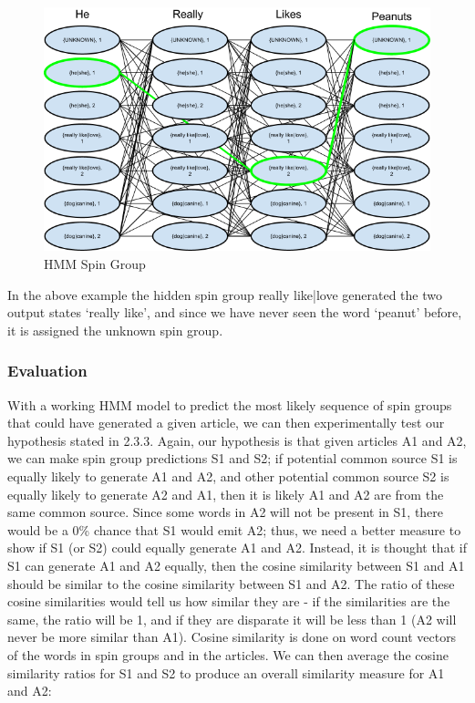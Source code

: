 \documentclass[11pt,letterpaper,oneside, titlepage]{scrartcl}
\begin{document}
\begin{figure}[h!]
  \centering
  \includegraphics[width=1\textwidth]{hmm_spin_group}
  \caption{HMM Spin Group}
  \label{fig:hmm_spin_group}
\end{figure}

\clearpage

In the above example the hidden spin group {really like|love} generated the two output states ‘really like’, and since we have never seen the word ‘peanut’ before, it is assigned the unknown spin group.

\subsubsection{Evaluation}

With a working HMM model to predict the most likely sequence of spin groups that could have generated a given article, we can then experimentally test our hypothesis stated in 2.3.3. Again, our hypothesis is that given articles A1 and A2, we can make spin group predictions S1 and S2; if potential common source S1 is equally likely to generate A1 and A2, and other potential common source S2 is equally likely to generate A2 and A1, then it is likely A1 and A2 are from the same common source. Since some words in A2 will not be present in S1, there would be a 0\% chance that S1 would emit A2; thus, we need a better measure to show if S1 (or S2) could equally generate A1 and A2. Instead, it is thought that if S1 can generate A1 and A2 equally, then the cosine similarity between S1 and A1 should be similar to the cosine similarity between S1 and A2. The ratio of these cosine similarities would tell us how similar they are - if the similarities are the same, the ratio will be 1, and if they are disparate it will be less than 1 (A2 will never be more similar than A1). Cosine similarity is done on word count vectors of the words in spin groups and in the articles. We can then average the cosine similarity ratios for S1 and S2 to produce an overall similarity measure for A1 and A2:
\end{document}
